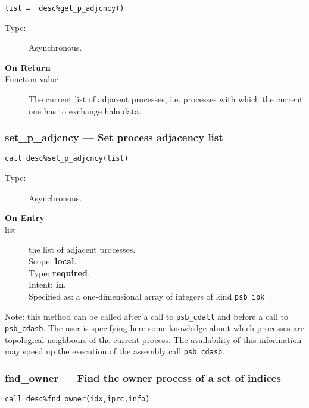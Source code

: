 \begin{verbatim}
list =  desc%get_p_adjcncy()
\end{verbatim}

\begin{description}
\item[Type:] Asynchronous.
\item[\bf On Return]
\item[Function value] The current list of adjacent processes,
  i.e. processes with which the current one has to exchange halo
  data. 

\end{description}

\subsubsection{set\_p\_adjcncy --- Set process adjacency list}

\begin{verbatim}
call desc%set_p_adjcncy(list)
\end{verbatim}

\begin{description}
\item[Type:] Asynchronous.
\item[\bf On Entry]
\item[list] the list of adjacent processes.\\
Scope: {\bf local}.\\
Type: {\bf required}.\\
Intent: {\bf in}.\\
Specified as: a one-dimensional array of integers of kind \verb|psb_ipk_|. 
\end{description}
Note: this method can be called after a call  to \verb|psb_cdall| and
before a call to \verb|psb_cdasb|. The user is specifying here some
knowledge about which processes are topological neighbours of the
current process. The availability of this information may speed up the
execution of the assembly call \verb|psb_cdasb|. 


\subsubsection{fnd\_owner --- Find the owner process of a set of indices}

\begin{verbatim}
call desc%fnd_owner(idx,iprc,info)
\end{verbatim}

